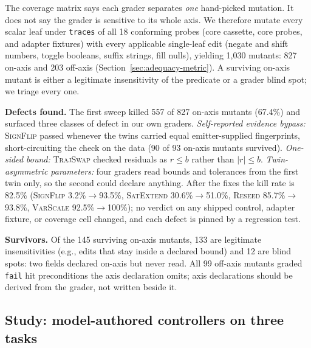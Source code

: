 \documentclass[sigconf,review,anonymous]{acmart}
\begin{document}
	The coverage matrix says each grader separates \emph{one} hand-picked
	mutation. It does not say the grader is sensitive to its whole axis. We
	therefore mutate every scalar leaf under \texttt{traces} of all 18
	conforming probes (core cassette, core probes, and adapter fixtures) with
	every applicable single-leaf edit (negate and shift numbers, toggle
	booleans, suffix strings, fill nulls), yielding 1{,}030 mutants: 827
	on-axis and 203 off-axis (Section~\ref{sec:adequacy-metric}). A surviving
	on-axis mutant is either a legitimate insensitivity of the predicate or a
	grader blind spot; we triage every one.
	
	\textbf{Defects found.} The first sweep killed 557 of 827 on-axis mutants
	(67.4\%) and surfaced three classes of defect in our own graders.
	\emph{Self-reported evidence bypass:} \textsc{SignFlip} passed whenever
	the twins carried equal emitter-supplied fingerprints, short-circuiting
	the check on the data (90 of 93 on-axis mutants survived).
	\emph{One-sided bound:} \textsc{TrajSwap} checked residuals as $r \le b$
	rather than $|r| \le b$. \emph{Twin-asymmetric parameters:} four graders
	read bounds and tolerances from the first twin only, so the second could
	declare anything. After the fixes the kill rate is 82.5\%
	(\textsc{SignFlip} 3.2\%$\to$93.5\%, \textsc{SatExtend}
	30.6\%$\to$51.0\%, \textsc{Reseed} 85.7\%$\to$93.8\%, \textsc{VarScale}
	92.5\%$\to$100\%); no verdict on any shipped control, adapter fixture, or
	coverage cell changed, and each defect is pinned by a regression test.
	
	\textbf{Survivors.} Of the 145 surviving on-axis mutants, 133 are
	legitimate insensitivities (e.g., edits that stay inside a declared
	bound) and 12 are blind spots: two fields declared on-axis but never
	read. All 99 off-axis mutants graded \texttt{fail} hit preconditions the
	axis declaration omits; axis declarations should be derived from the
	grader, not written beside it.
	
	\subsection{Study: model-authored controllers on three tasks}
	\label{sec:pilot}
\end{document}

